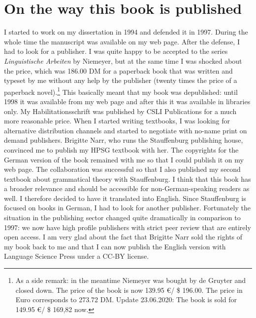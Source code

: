 \section*{On the way this book is published}

I started to work on my dissertation in 1994 and defended it in 1997. During the whole time the
manuscript was available on my web page. After the defense, I had to look for a publisher. I was
quite happy to be accepted to the series \emph{Linguistische Arbeiten} by Niemeyer, but at the same time I
was shocked about the price, which was 186.00 DM for a paperback book that was written and typeset
by me without any help by the publisher (twenty times the price of a paperback novel).\footnote{%
  As a side remark: in the meantime Niemeyer was bought by de Gruyter and closed down. The price of the book is now
  139.95 \euro / \$ 196.00. The price in Euro corresponds to 273.72 DM. Update 23.06.2020: The book
  is sold for 149.95 \euro / \$ 169,82 now.
} This
basically meant that my book was depublished: until 1998 it was available from my web page and after
this it was available in libraries only. My Habilitationsschrift was published by CSLI Publications
for a much more reasonable price. When I started writing textbooks, I was looking for alternative
distribution channels and started to negotiate with no-name print on demand publishers. Brigitte Narr,
who runs the Stauffenburg publishing house, convinced me to publish my HPSG textbook with her. The
copyrights for the German version of the book remained with me so that I could publish it on my web page. The collaboration was successful so that I also published my second textbook about
grammatical theory with Stauffenburg. I think that this book has a broader relevance and should be
accessible for non-German-speaking readers as well. I therefore decided to have it translated into
English. Since Stauffenburg is focused on books in German, I had to look for another publisher. Fortunately the situation in the publishing sector changed quite dramatically in comparison
to 1997: we now have high profile publishers with strict peer review that are entirely open access. I am very
glad about the fact that Brigitte Narr sold the rights of my book back to me and that I can now 
publish the English version with Language Science Press under a CC-BY license.



